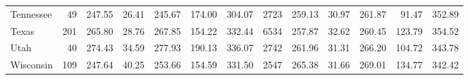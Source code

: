 \begin{sidewaystable}[htb]
\begin{center}
{\begin{tabular}{lrrrrrr@{\extracolsep{10pt}}rrrrrr}
  Tennessee &  49 & 247.55 & 26.41 & 245.67 & 174.00 & 304.07 & 2723 & 259.13 & 30.97 & 261.87 & 91.47 & 352.89 \\ 
  Texas & 201 & 265.80 & 28.76 & 267.85 & 154.22 & 332.44 & 6534 & 257.87 & 32.62 & 260.45 & 123.79 & 354.52 \\ 
  Utah &  40 & 274.43 & 34.59 & 277.93 & 190.13 & 336.07 & 2742 & 261.96 & 31.31 & 266.20 & 104.72 & 343.78 \\ 
  Wisconsin & 109 & 247.64 & 40.25 & 253.66 & 154.59 & 331.50 & 2547 & 265.38 & 31.66 & 269.01 & 134.77 & 342.42 \\ 
   \hline
\end{tabular}
}
\end{center}
\end{sidewaystable}
